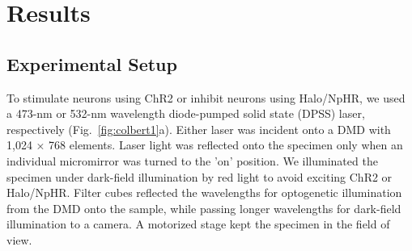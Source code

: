 \section{Results}
\subsection{Experimental Setup}
To stimulate neurons using ChR2 or inhibit neurons using Halo/NpHR, we used a 473-nm or 532-nm wavelength diode-pumped solid state (DPSS) laser, respectively  (Fig.~\ref{fig:colbert1}a). Either laser was incident onto a DMD with 1,024 × 768 elements. Laser light was reflected onto the specimen only when an individual micromirror was turned to the 'on' position. We illuminated the specimen under dark-field illumination by red light to avoid exciting ChR2 or Halo/NpHR. Filter cubes reflected the wavelengths for optogenetic illumination from the DMD onto the sample, while passing longer wavelengths for dark-field illumination to a camera. A motorized stage kept the specimen in the field of view.




